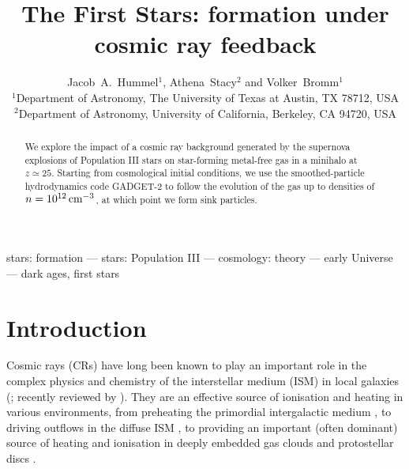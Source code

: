 \documentclass[usenatbib]{mn2e}
\title[First stars under cosmic ray feedback]{The First Stars: formation under cosmic ray feedback}
\author[J.A.~Hummel et al.]{Jacob~A.~Hummel$^{1}$, Athena~Stacy$^{2}$ and Volker~Bromm$^{1}$\\
$^1$Department of Astronomy, The University of Texas at Austin, TX 78712, USA\\
$^2$Department of Astronomy, University of California, Berkeley, CA 94720, USA}
\newcommand{\cc}{\,{\rm cm}^{-3}}
\begin{document}


\maketitle

\begin{abstract}
We explore the impact of a cosmic ray background generated by the supernova explosions of Population III stars on star-forming metal-free gas in a minihalo at $z\simeq25$.  Starting from cosmological initial conditions, we use the smoothed-particle hydrodynamics code GADGET-2 to follow the evolution of the gas up to densities of $n=10^{12}\cc$, at which point we form sink particles.
\end{abstract}












\begin{keywords}
stars: formation --- stars: Population III --- cosmology: theory --- early Universe --- dark ages, first stars
\end{keywords}

\section{Introduction}
\label{intro}

Cosmic rays (CRs) have long been known to play an important role in the complex physics and chemistry of the interstellar medium (ISM) in local galaxies (\citealt{SpitzerTomasko1968,SpitzerScott1969,GlassgoldLanger1973,GoldsmithLanger1978,CravensDalgarno1978,MannheimSchlickeiser1994,Tielens2005}; recently reviewed by \citealt{StrongMoskalenkoPtuskin2007,GrenierBlackStrong2015}).  
They are an effective source of ionisation and heating in various environments, from preheating the primordial intergalactic medium  \citep[IGM;][]{SazonovSunyaev2015}, to driving outflows in the diffuse ISM \citep[e.g.,][]{Ensslinetal2007,Jubelgasetal2008,SalemBryan2014,Hanaszetal2013,Boothetal2013,SalemBryanHummels2014}, to providing an important (often dominant) source of heating and ionisation in deeply embedded gas clouds and protostellar discs \citep{Spitzer1978,DalgarnoYanLiu1999,IndrioloFieldsMcCall2009,PadovaniGalliGlassgold2009,GlassgoldGalliPadovani2012,PadovaniHennebelleGalli2013,Padovanietal2015}. 
\end{document}

